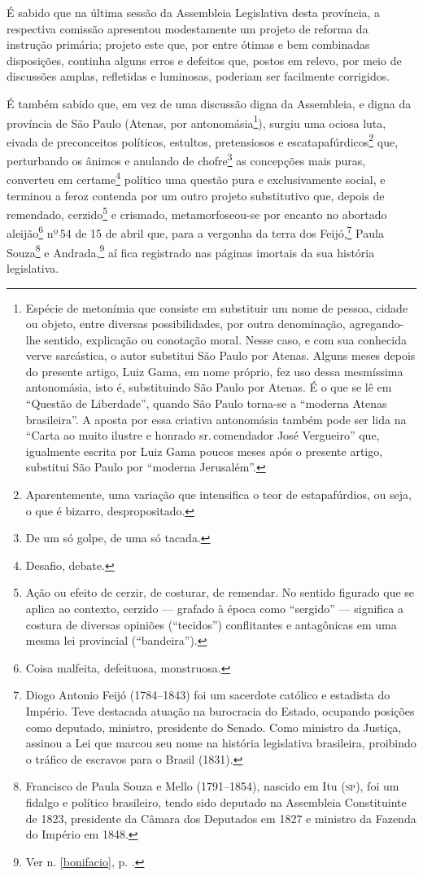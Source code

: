 É sabido que na última sessão da Assembleia Legislativa desta província,
a respectiva comissão apresentou modestamente um projeto de reforma da
instrução primária; projeto este que, por entre ótimas e bem combinadas
disposições, continha alguns erros e defeitos que, postos em relevo, por
meio de discussões amplas, refletidas e luminosas, poderiam ser
facilmente corrigidos.

É também sabido que, em vez de uma discussão digna da Assembleia, e
digna da província de São Paulo (Atenas, por antonomásia\footnote{
  Espécie de metonímia que consiste em substituir um nome de pessoa,
  cidade ou objeto, entre diversas possibilidades, por outra
  denominação, agregando-lhe sentido, explicação ou conotação moral.
  Nesse caso, e com sua conhecida verve sarcástica, o autor substitui São
  Paulo por Atenas. Alguns meses depois do presente artigo, Luiz Gama,
  em nome próprio, fez uso dessa mesmíssima antonomásia, isto é,
  substituindo São Paulo por Atenas. É o que se lê em ``Questão de
  Liberdade'', quando São Paulo torna-se a ``moderna Atenas brasileira''. A
  aposta por essa criativa antonomásia também pode ser lida na
  ``Carta ao muito ilustre e honrado sr.\,comendador José Vergueiro''
  que, igualmente escrita por Luiz Gama poucos meses após o presente
  artigo, substitui São Paulo por ``moderna Jerusalém''.}), surgiu uma
ociosa luta, eivada de preconceitos políticos, estultos, pretensiosos e
escatapafúrdicos\footnote{Aparentemente, uma variação que intensifica
  o teor de estapafúrdios, ou seja, o que é bizarro, despropositado.}
que, perturbando os ânimos e anulando de chofre\footnote{De um só
  golpe, de uma só tacada.} as concepções mais puras, converteu em
certame\footnote{Desafio, debate.} político uma questão pura e
exclusivamente social, e terminou a feroz contenda por um outro projeto
substitutivo que, depois de remendado, cerzido\footnote{Ação ou efeito
  de cerzir, de costurar, de remendar. No sentido figurado que se aplica
  ao contexto, cerzido --- grafado à época como ``sergido'' --- significa a
  costura de diversas opiniões (``tecidos'') conflitantes e antagônicas em
  uma mesma lei provincial (``bandeira'').} e crismado, metamorfoseou-se
por encanto no abortado aleijão\footnote{Coisa malfeita, defeituosa,
  monstruosa.} nº\,54 de 15 de abril que, para a vergonha da terra dos
Feijó,\footnote{Diogo Antonio Feijó (1784--1843) foi um sacerdote\label{feijo}
  católico e estadista do Império. Teve destacada atuação na burocracia
  do Estado, ocupando posições como deputado, ministro, presidente do
  Senado. Como ministro da Justiça, assinou a Lei que marcou seu nome na
  história legislativa brasileira, proibindo o tráfico de escravos para
  o Brasil (1831).} Paula Souza\footnote{Francisco de Paula Souza e
  Mello (1791--1854), nascido em Itu (\textsc{sp}), foi um fidalgo e político
  brasileiro, tendo sido deputado na Assembleia Constituinte de 1823,
  presidente da Câmara dos Deputados em 1827 e ministro da Fazenda do
  Império em 1848.} e Andrada,\footnote{Ver n. \ref{bonifacio}, p. \pageref{bonifacio}.} 
  aí fica registrado nas páginas imortais da sua história legislativa.


